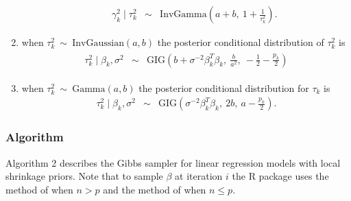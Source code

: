 \documentclass[nojss]{jss}
\begin{document}
\begin{enumerate}
\begin{itemize}
\begin{eqnarray*}
          \gamma_k^2\mid \tau_k^2 &\sim& \mathrm{InvGamma} \left( a + b,\ 1 + \frac{1}{\tau_k^2} \right).
        \end{eqnarray*}
  	\end{itemize}
  \item when  $\tau^2_k \ \sim\ \mathrm{InvGaussian}(a, b)$ the posterior
  conditional distribution of $\tau_k^2$ is
\begin{eqnarray*}
	\begin{split}
		\tau_k^2\mid\beta_k,\sigma^2 &\sim& \mathrm{GIG}\left( b + \sigma^{-2} \beta_{k}^T \beta_{k},\ \frac{b}{a^2},\ -\frac{1}{2}-\frac{p_k}{2} \right)
	\end{split}
\end{eqnarray*}
\item when  $\tau^2_k \ \sim\  \mathrm{Gamma}(a, b)$ the posterior
conditional distribution for $\tau_k$ is
\begin{eqnarray*}
		\tau_k^2\mid\beta_k,\sigma^2 &\sim& \mathrm{GIG}\left( \sigma^{-2} \beta_{k}^T \beta_{k},\ 2b ,\ a-\frac{p_k}{2} \right).
\end{eqnarray*}
\end{enumerate}

\subsubsection{Algorithm}

Algorithm 2 describes the Gibbs sampler for linear regression models with local
shrinkage priors. Note that to sample $\beta$ at iteration $i$ the R package
 uses the method of \citet{rue2001} when $n>p$ and the method
of \citet{bhattacharya2016} when $n\leq p$.
\end{document}
